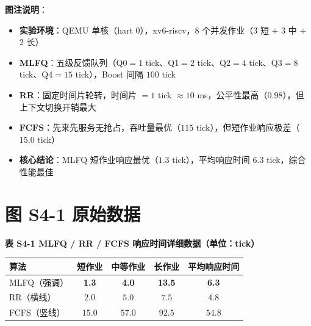 \documentclass[12pt,a4paper]{article}
\begin{document}
\noindent\textbf{图注说明}：
\vspace{-0.5em}
\begin{itemize}\setlength\itemsep{0.2em}
  \item \textbf{实验环境}：QEMU 单核（hart 0），xv6-riscv，8 个并发作业（3 短 + 3 中 + 2 长）
  \item \textbf{MLFQ}：五级反馈队列（Q0$=1$ tick、Q1$=2$ tick、Q2$=4$ tick、Q3$=8$ tick、Q4$=15$ tick），Boost 间隔 $100$ tick
  \item \textbf{RR}：固定时间片轮转，时间片 $=1$ tick $\approx 10$ ms，公平性最高（$0.98$），但上下文切换开销最大
  \item \textbf{FCFS}：先来先服务无抢占，吞吐量最优（$115$ tick），但短作业响应极差（$15.0$ tick）
  \item \textbf{核心结论}：MLFQ 短作业响应最优（$1.3$ tick），平均响应时间 $6.3$ tick，综合性能最佳
\end{itemize}

\vfill

\section*{图 S4-1 原始数据}

\vspace{0.5em}

\noindent\textbf{表 S4-1 \quad MLFQ / RR / FCFS 响应时间详细数据（单位：tick）}

\vspace{0.8em}

\noindent\begin{tabular}{lcccc}
  \toprule
  \textbf{算法} & \textbf{短作业} & \textbf{中等作业} & \textbf{长作业} & \textbf{平均响应时间} \\
  \midrule
  MLFQ（强调） & \cellcolor{gray!20}\textbf{1.3} & \cellcolor{gray!20}\textbf{4.0} & \cellcolor{gray!20}\textbf{13.5} & \cellcolor{gray!20}\textbf{6.3} \\
  RR（横线）   & $2.0$ & $5.0$ & $7.5$  & $4.8$ \\
  FCFS（竖线） & $15.0$ & $57.0$ & $92.5$ & $54.8$ \\
  \bottomrule
\end{tabular}
\end{document}
